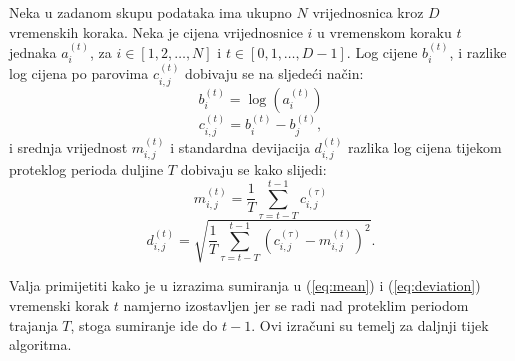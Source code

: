 \documentclass[lmodern, utf8, diplomski, numeric]{fer}
\begin{document}
  Neka u zadanom skupu podataka ima ukupno $N$ vrijednosnica kroz $D$ vremenskih koraka.
  Neka je cijena vrijednosnice $i$ u vremenskom koraku $t$ jednaka $a_i^{\left(t\right)}$, za $i \in {\left[1, 2, \ldots, N\right]}$ i $t \in {\left[0, 1, \ldots, D-1\right]}$.
  Log cijene $b_i^{\left(t\right)}$, i razlike log cijena po parovima $c_{i,j}^{\left(t\right)}$ dobivaju se na sljedeći način:
  \begin{equation} b_i^{\left(t\right)} = \log\left(a_i^{\left(t\right)}\right) \end{equation}
  \begin{equation} c_{i,j}^{\left(t\right)} = b_i^{\left(t\right)} - b_j^{\left(t\right)}, \end{equation}
  i srednja vrijednost $m_{i,j}^{\left(t\right)}$ i standardna devijacija $d_{i,j}^{\left(t\right)}$ razlika log cijena tijekom proteklog perioda duljine $T$ dobivaju se kako slijedi:
  \begin{equation}
  \label{eq:mean}
  m_{i,j}^{\left(t\right)} = \frac{1}{T}\sum_{\tau = t - T}^{t - 1} c_{i,j}^{(\tau)}
  \end{equation}
  \begin{equation}
  \label{eq:deviation}
  d_{i,j}^{\left(t\right)} = \sqrt{\frac{1}{T}\sum_{\tau=t - T}^{t - 1} \left(c_{i,j}^{(\tau)} - m_{i,j}^{\left(t\right)} \right)^2}.
  \end{equation}
  
  Valja primijetiti kako je u izrazima sumiranja u (\ref{eq:mean}) i (\ref{eq:deviation}) vremenski korak $t$ namjerno izostavljen jer se radi nad proteklim periodom trajanja $T$, stoga sumiranje ide do $t - 1$.
  Ovi izračuni su temelj za daljnji tijek algoritma.
\end{document}
